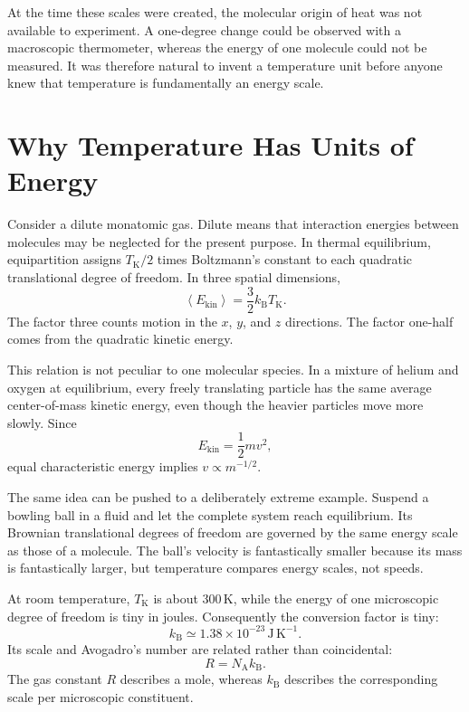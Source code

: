 At the time these scales were created, the molecular origin of heat was not
available to experiment. A one-degree change could be observed with a
macroscopic thermometer, whereas the energy of one molecule could not be
measured. It was therefore natural to invent a temperature unit before anyone
knew that temperature is fundamentally an energy scale.

\section{Why Temperature Has Units of Energy}

Consider a dilute monatomic gas. Dilute means that interaction energies between
molecules may be neglected for the present purpose. In thermal equilibrium,
equipartition assigns \(T_{\mathrm K}/2\) times Boltzmann's constant to each
quadratic translational degree of freedom. In three spatial dimensions,
\begin{equation}
 \left\langle E_{\mathrm{kin}}\right\rangle
 =\frac{3}{2}k_{\mathrm B}T_{\mathrm K}.
 \label{eq:sm2-equipartition-kelvin}
\end{equation}
The factor three counts motion in the \(x\), \(y\), and \(z\) directions. The
factor one-half comes from the quadratic kinetic energy.

This relation is not peculiar to one molecular species. In a mixture of helium
and oxygen at equilibrium, every freely translating particle has the same
average center-of-mass kinetic energy, even though the heavier particles move
more slowly. Since
\begin{equation}
 E_{\mathrm{kin}}=\frac{1}{2}mv^2,
\end{equation}
equal characteristic energy implies \(v\propto m^{-1/2}\).

The same idea can be pushed to a deliberately extreme example. Suspend a
bowling ball in a fluid and let the complete system reach equilibrium. Its
Brownian translational degrees of freedom are governed by the same energy
scale as those of a molecule. The ball's velocity is fantastically smaller
because its mass is fantastically larger, but temperature compares energy
scales, not speeds.

At room temperature, \(T_{\mathrm K}\) is about \(300\,\mathrm K\), while the
energy of one microscopic degree of freedom is tiny in joules. Consequently
the conversion factor is tiny:
\begin{equation}
 k_{\mathrm B}\simeq 1.38\times10^{-23}\,
 \mathrm{J\,K^{-1}}.
 \label{eq:sm2-boltzmann-value}
\end{equation}
Its scale and Avogadro's number are related rather than coincidental:
\begin{equation}
 R=N_{\mathrm A}k_{\mathrm B}.
\end{equation}
The gas constant \(R\) describes a mole, whereas \(k_{\mathrm B}\) describes
the corresponding scale per microscopic constituent.

